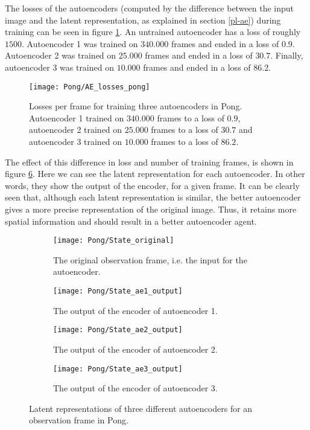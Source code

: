 The losses of the autoencoders (computed by the difference between the input image and the latent representation, as explained in section \ref{pl-ae}) during training can be seen in figure \ref{fig:ae-loss-pong}. An untrained autoencoder has a loss of roughly $1500$. Autoencoder 1 was trained on $340.000$ frames and ended in a loss of $0.9$. Autoencoder 2 was trained on $25.000$ frames and ended in a loss of $30.7$. Finally, autoencoder 3 was trained on $10.000$ frames and ended in a loss of $86.2$.

\begin{figure}[h]
    \centering
   	\texttt{[image: Pong/AE\_losses\_pong]}
    	\caption{Losses per frame for training three autoencoders in Pong. Autoencoder 1 trained on $340.000$ frames to a loss of $0.9$, autoencoder 2 trained on $25.000$ frames to a loss of $30.7$ and autoencoder 3 trained on $10.000$ frames to a loss of $86.2$.}
    	\label{fig:ae-loss-pong}
\end{figure}

The effect of this difference in loss and number of training frames, is shown in figure \ref{fig:ae-output-pong}. Here we can see the latent representation for each autoencoder. In other words, they show the output of the encoder, for a given frame. It can be clearly seen that, although each latent representation is similar, the better autoencoder gives a more precise representation of the original image. Thus, it retains more spatial information and should result in a better autoencoder agent.

\begin{figure}[h]
	\centering
	\begin{subfigure}[b]{0.40\textwidth}
		\texttt{[image: Pong/State\_original]}
		\caption{The original observation frame, i.e. the input for the autoencoder.}
		\label{fig:ae-state-original-pong} 
	\end{subfigure}\hfill
	\begin{subfigure}[b]{0.40\textwidth}
		\texttt{[image: Pong/State\_ae1\_output]}
		\caption{The output of the encoder of autoencoder 1.}
		\medskip
		\label{fig:ae1-state-pong}
	\end{subfigure}
	\begin{subfigure}[b]{0.4\textwidth}
		\texttt{[image: Pong/State\_ae2\_output]}
		\caption{The output of the encoder of autoencoder 2.}
		\label{fig:ae2-state-pong}
	\end{subfigure}\hfill
	\begin{subfigure}[b]{0.4\textwidth}
		\texttt{[image: Pong/State\_ae3\_output]}
		\caption{The output of the encoder of autoencoder 3.}
		\label{fig:ae3-state-pong}
	\end{subfigure}
	\caption{Latent representations of three different autoencoders for an observation frame in Pong.}
	\label{fig:ae-output-pong}
\end{figure}

